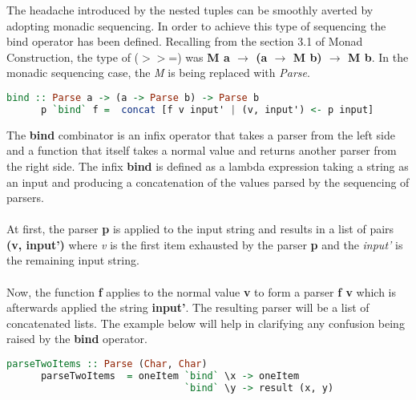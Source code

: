 \documentclass[a4paper, onecolumn]{article}
\begin{document}
    The headache introduced by the nested tuples can be smoothly averted by adopting monadic sequencing. In order to achieve this type of sequencing the bind operator has been defined. Recalling from the section 3.1 of Monad Construction, the type of ($>>$=) was {\textbf{M a $\rightarrow$ (a $\rightarrow$ M b) $\rightarrow$ M b}}. In the monadic sequencing case, the \textit{M} is being replaced with \textit{Parse}.
    
    \begin{tcolorbox}
    
    \begin{lstlisting}[language=Haskell]
      bind :: Parse a -> (a -> Parse b) -> Parse b
      p `bind` f =  concat [f v input' | (v, input') <- p input]
    \end{lstlisting}
    \end{tcolorbox}
    
    \noindent The \textbf{bind} combinator is an infix operator that takes a parser from the left side and a function that itself takes a normal value and returns another parser from the right side. The infix \textbf{bind} is defined as a lambda expression taking a string as an input and producing a concatenation of the values parsed by the sequencing of parsers. \\ \\
    At first, the parser \textbf{p} is applied to the input string and results in a list of pairs \textbf{(v, input')} where \textit{v} is the first item exhausted by the parser \textbf{p} and the \textit{input'} is the remaining input string. \\ \\
    Now, the function \textbf{f} applies to the normal value \textbf{v} to form a parser \textbf{f v} which is afterwards applied the string \textbf{input'}. The resulting parser will be a list of concatenated lists. The example below will help in clarifying any confusion being raised by the \textbf{bind} operator. 
    
    \begin{tcolorbox}
    \begin{lstlisting}[language=Haskell]
      parseTwoItems :: Parse (Char, Char)
      parseTwoItems  = oneItem `bind` \x -> oneItem 
                               `bind` \y -> result (x, y)
    \end{lstlisting}
    \end{tcolorbox}
    
\end{document}

